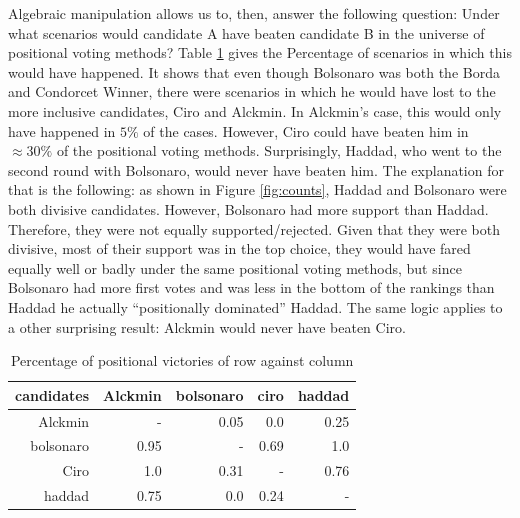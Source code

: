 \documentclass[hidelinks,11pt]{article}
\begin{document}
Algebraic manipulation allows us to, then, answer the following question: Under what scenarios would candidate A have beaten candidate B in the universe of positional voting methods? Table \ref{tab:percentage} gives the Percentage of scenarios in which this would have happened. It shows that even though Bolsonaro was both the Borda and Condorcet Winner, there were scenarios in which he would have lost to the more inclusive candidates, Ciro and Alckmin. In Alckmin's case, this would only have happened in \(5\%\) of the cases. However, Ciro could have beaten him in \(\approx 30\%\) of the positional voting methods. Surprisingly, Haddad, who went to the second round with Bolsonaro, would never have beaten him. The explanation for that is the following: as shown in Figure \ref{fig:counts}, Haddad and Bolsonaro were both divisive candidates. However, Bolsonaro had more support than Haddad. Therefore, they were not equally supported/rejected. Given that they were both divisive, most of their support was in the top choice, they would have fared equally well or badly under the same positional voting methods, but since Bolsonaro had more first votes and was less in the bottom of the rankings than Haddad he actually ``positionally dominated'' Haddad. The same logic applies to a other surprising result: Alckmin would never have beaten Ciro.


\begin{table}[]
  \centering
\begin{tabular}{|r|r|r|r|r|}
\hline
\textbf{candidates} & \textbf{Alckmin} & \textbf{bolsonaro} & \textbf{ciro} & \textbf{haddad} \\ \hline
Alckmin             & -             & 0.05               & 0.0           & 0.25            \\ \hline
bolsonaro           & 0.95             & -            & 0.69          & 1.0             \\ \hline
Ciro                & 1.0              & 0.31               & -           & 0.76            \\ \hline
haddad              & 0.75             & 0.0                & 0.24          & -            \\ \hline
\end{tabular}
\caption{Percentage of positional victories of row against column}
\label{tab:percentage}
\end{table}
\end{document}
